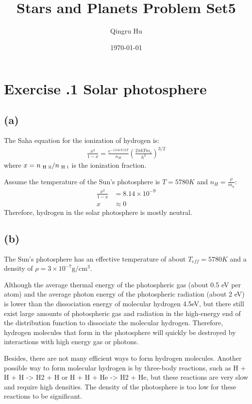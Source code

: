\documentclass[a4paper,12pt]{article}
\title{\textbf{Stars and Planets Problem Set5}}
\author{Qingru Hu}
\date{\today}
\newcommand{\cm}{\mathrm{cm}}
\newcommand{\g}{\mathrm{g}}
\begin{document}
\maketitle
\section*{\textbf{Exercise \uppercase\expandafter{}.1 Solar photosphere}}
\subsection*{(a)}
The Saha equation for the ionization of hydrogen is:
\begin{align*}
    \frac{x^2}{1-x} = \frac{e^{-13.6eV/kT}}{n_H} (\frac{2\pi kT m_e}{h^2})^{3/2}
\end{align*}
where $x = n_{\text{ H \uppercase\expandafter{\romannumeral2}}} / n_{\text{ H \uppercase\expandafter{\romannumeral1}}}$ is 
the ionization fraction.

Assume the temperature of the Sun's photosphere is $T=5780K$ and $n_H = \frac{\rho}{m_u}$:
\begin{align*}
    \frac{x^2}{1-x} &= 8.14 \times 10^{-9} \\
    x & \approx 0
\end{align*}
Therefore, hydrogen in the solar photosphere is mostly neutral.

\subsection*{(b)}
The Sun's photosphere has an effective temperature of about $T_{eff}=5780 K$ and a density of $\rho = 3 \times 10^{-7} \g/\cm^3$.

Although the average thermal energy of the photospheric gas (about 0.5 eV per atom) and the average photon energy of the photospheric radiation (about 2 eV) is lower than the dissociation energy of molecular hydrogen 4.5eV, 
but there still exist large amounts of photospheric gas and radiation in the high-energy end of the distribution function to dissociate the molecular hydrogen. 
Therefore, hydrogen molecules that form in the photosphere will quickly be destroyed by interactions with high energy gas or photons.

Besides, there are not many efficient ways to form hydrogen molecules.
Another possible way to form molecular hydrogen is by three-body reactions, 
such as H + H + H -> H2 + H or H + H + He -> H2 + He, 
but these reactions are very slow and require high densities. 
The density of the photosphere is too low for these reactions to be significant.
\end{document}
